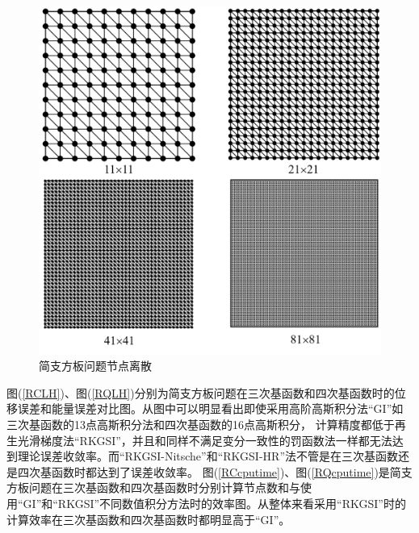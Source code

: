 \begin{figure}[H]
\centering
      \includegraphics[scale=0.4]{figure/PHR/R/rectangularmsh.png}
    \caption{简支方板问题节点离散}\label{rectangularmsh}
\end{figure}
\newpage
 图(\ref{RCLH})、图(\ref{RQLH})分别为简支方板问题在三次基函数和四次基函数时的位移误差和能量误差对比图。从图中可以明显看出即使采用高阶高斯积分法“GI”如三次基函数的13点高斯积分法和四次基函数的16点高斯积分，
计算精度都低于再生光滑梯度法“RKGSI”，并且和同样不满足变分一致性的罚函数法一样都无法达到理论误差收敛率。而“RKGSI-Nitsche”和“RKGSI-HR”法不管是在三次基函数还是四次基函数时都达到了误差收敛率。
图(\ref{RCcputime})、图(\ref{RQcputime})是简支方板问题在三次基函数和四次基函数时分别计算节点数和与使用“GI”和“RKGSI”不同数值积分方法时的效率图。从整体来看采用“RKGSI”时的计算效率在三次基函数和四次基函数时都明显高于“GI”。  
